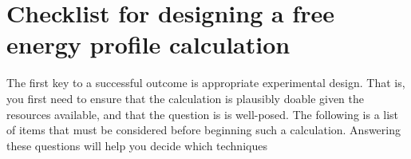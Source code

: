 
\section{Checklist for designing a free energy profile calculation}
\label{s:precheck}


The first key to a successful outcome is appropriate experimental design.  That is, you first need to ensure that the calculation is plausibly doable given the resources available, and that the question is is well-posed.  The following is a list of items that must be considered before beginning such a calculation.  Answering these questions will help you decide which techniques

